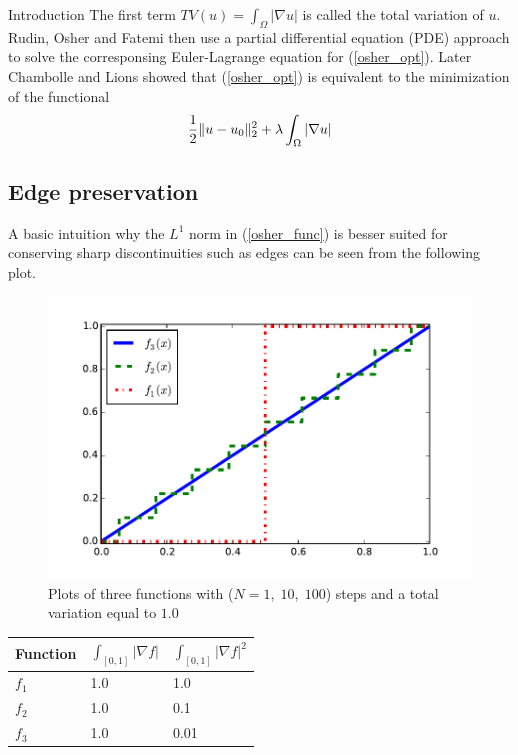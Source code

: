 \begin{chapter}{Introduction}
The first term $TV(u)=\int_\Omega\left\vert\nabla u\right\vert$ is called the total variation of $u$. Rudin, Osher and Fatemi then use a partial differential equation (PDE) approach to solve
the corresponsing Euler-Lagrange equation for (\ref{osher_opt}). Later Chambolle and Lions \cite{ChambolleLions} showed that (\ref{osher_opt}) is equivalent to the minimization of
the functional
\begin{equation}
    \label{osher_func}
    \frac{1}{2}\| u-u_0 \|_2^2 +\lambda \int_\Omega\left\vert\nabla u\right\vert
\end{equation}

\subsection{Edge preservation} %
\label{sub:Edge preservation}
A basic intuition why the $L^1$ norm in (\ref{osher_func}) is besser suited for conserving sharp discontinuities such as edges can be seen from the following plot.\\

\begin{figure}[h!]
        \centering
	    \includegraphics[width=0.9\linewidth]{./figures/introduction/tv12comparison.pdf}
	\caption[Comparison total variation]{Plots of three functions with ($N=1,\;10,\;100$) steps and a total variation equal to $1.0$}
	\label{fig:tv12comparison}
\end{figure}
\begin{table}[h!]
\centering
\begin{tabular}{|l|l|l|}
    \hline
    \textbf{Function} & $\int_{[0,1]}\left\vert\nabla f\right\vert$ & $\int_{[0,1]}\left\vert\nabla f\right\vert^2$ \\
    \hline
    $f_1$ & 1.0 & 1.0 \\
    $f_2$ & 1.0 & 0.1 \\
    $f_3$ & 1.0 & 0.01 \\
    \hline
\end{tabular}
\end{table}


\end{chapter}
